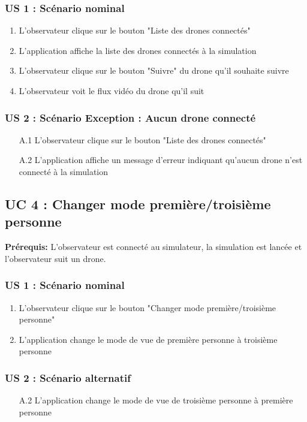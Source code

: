 \documentclass{scrartcl}
\begin{document}
\subsubsection*{US 1 : Scénario nominal}
\begin{enumerate}
    \item L'observateur clique sur le bouton "Liste des drones connectés"
    \item L'application affiche la liste des drones connectés à la simulation
    \item L'observateur clique sur le bouton "Suivre" du drone qu'il souhaite suivre
    \item L'observateur voit le flux vidéo du drone qu'il suit
\end{enumerate}

\subsubsection*{US 2 : Scénario Exception : Aucun drone connecté}
\begin{enumerate}
    \item[A.1] L'observateur clique sur le bouton "Liste des drones connectés"
    \item[A.2] L'application affiche un message d'erreur indiquant qu'aucun drone n'est connecté à la simulation
\end{enumerate}

\subsection{UC 4 : Changer mode première/troisième personne}
\textbf{Prérequis:} L'observateur est connecté au simulateur, la simulation est lancée et l'observateur suit un drone.

\subsubsection*{US 1 : Scénario nominal}
\begin{enumerate}
    \item L'observateur clique sur le bouton "Changer mode première/troisième personne"
    \item L'application change le mode de vue de première personne à troisième personne
\end{enumerate}

\subsubsection*{US 2 : Scénario alternatif}
\begin{enumerate}
    \item[A.2] L'application change le mode de vue de troisième personne à première personne
\end{enumerate}
\end{document}
